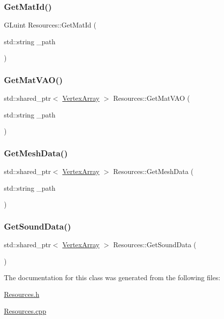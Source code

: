\subsubsection{\texorpdfstring{Get\+Mat\+Id()}{GetMatId()}}
{\footnotesize\ttfamily G\+Luint Resources\+::\+Get\+Mat\+Id (\begin{DoxyParamCaption}\item[{std\+::string}]{\+\_\+path }\end{DoxyParamCaption})}

\mbox{\label{class_resources_a8225551fdeddbf2b6f34d44323f7333e}} 
\subsubsection{\texorpdfstring{Get\+Mat\+V\+A\+O()}{GetMatVAO()}}
{\footnotesize\ttfamily std\+::shared\+\_\+ptr$<$ \mbox{\hyperlink{class_vertex_array}{Vertex\+Array}} $>$ Resources\+::\+Get\+Mat\+V\+AO (\begin{DoxyParamCaption}\item[{std\+::string}]{\+\_\+path }\end{DoxyParamCaption})}

\mbox{\label{class_resources_adf647cccbff04491447ef4ccb262e2de}} 
\subsubsection{\texorpdfstring{Get\+Mesh\+Data()}{GetMeshData()}}
{\footnotesize\ttfamily std\+::shared\+\_\+ptr$<$ \mbox{\hyperlink{class_vertex_array}{Vertex\+Array}} $>$ Resources\+::\+Get\+Mesh\+Data (\begin{DoxyParamCaption}\item[{std\+::string}]{\+\_\+path }\end{DoxyParamCaption})}

\mbox{\label{class_resources_a163cbc0337f5262b19098766d85196a1}} 
\subsubsection{\texorpdfstring{Get\+Sound\+Data()}{GetSoundData()}}
{\footnotesize\ttfamily std\+::shared\+\_\+ptr$<$ \mbox{\hyperlink{class_vertex_array}{Vertex\+Array}} $>$ Resources\+::\+Get\+Sound\+Data (\begin{DoxyParamCaption}{ }\end{DoxyParamCaption})}



The documentation for this class was generated from the following files\+:\begin{DoxyCompactItemize}
\item 
\mbox{\hyperlink{_resources_8h}{Resources.\+h}}\item 
\mbox{\hyperlink{_resources_8cpp}{Resources.\+cpp}}\end{DoxyCompactItemize}

